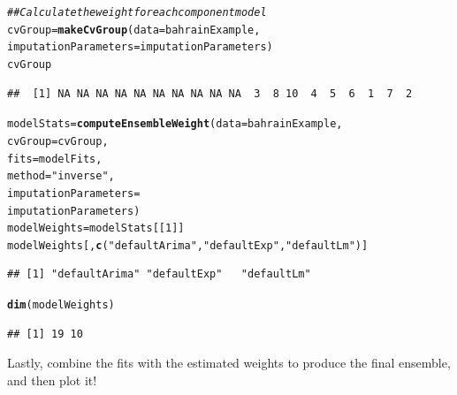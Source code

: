 \documentclass[nojss]{jss}\usepackage[]{graphicx}\usepackage[]{color}
\makeatletter
\newcommand{\hlnum}[1]{\textcolor[rgb]{0.686,0.059,0.569}{#1}}%
\newcommand{\hlstr}[1]{\textcolor[rgb]{0.192,0.494,0.8}{#1}}%
\newcommand{\hlcom}[1]{\textcolor[rgb]{0.678,0.584,0.686}{\textit{#1}}}%
\newcommand{\hlstd}[1]{\textcolor[rgb]{0.345,0.345,0.345}{#1}}%
\newcommand{\hlkwb}[1]{\textcolor[rgb]{0.69,0.353,0.396}{#1}}%
\newcommand{\hlkwc}[1]{\textcolor[rgb]{0.333,0.667,0.333}{#1}}%
\newcommand{\hlkwd}[1]{\textcolor[rgb]{0.737,0.353,0.396}{\textbf{#1}}}%
\newenvironment{kframe}{%
 \def\at@end@of@kframe{}%
 \ifinner\ifhmode%
  \def\at@end@of@kframe{\end{minipage}}%
  \begin{minipage}{\columnwidth}%
 \fi\fi%
 \def\FrameCommand##1{\hskip\@totalleftmargin \hskip-\fboxsep
 \colorbox{shadecolor}{##1}\hskip-\fboxsep
     \hskip-\linewidth \hskip-\@totalleftmargin \hskip\columnwidth}%
 \MakeFramed {\advance\hsize-\width
   \@totalleftmargin\z@ \linewidth\hsize
   \@setminipage}}%
 {\par\unskip\endMakeFramed%
 \at@end@of@kframe}
\newenvironment{knitrout}{}{} %
\makeatother
\begin{document}
\begin{knitrout}
\color{fgcolor}\begin{kframe}
\begin{alltt}
\hlcom{## Calculate the weight for each component model}
\hlstd{cvGroup} \hlkwb{=} \hlkwd{makeCvGroup}\hlstd{(}\hlkwc{data} \hlstd{= bahrainExample,}
                      \hlkwc{imputationParameters} \hlstd{= imputationParameters)}
\hlstd{cvGroup}
\end{alltt}
\begin{verbatim}
##  [1] NA NA NA NA NA NA NA NA NA NA  3  8 10  4  5  6  1  7  2
\end{verbatim}
\begin{alltt}
\hlstd{modelStats} \hlkwb{=} \hlkwd{computeEnsembleWeight}\hlstd{(}\hlkwc{data} \hlstd{= bahrainExample,}
                                   \hlkwc{cvGroup} \hlstd{= cvGroup,}
                                   \hlkwc{fits} \hlstd{= modelFits,}
                                   \hlkwc{method} \hlstd{=} \hlstr{"inverse"}\hlstd{,}
                                   \hlkwc{imputationParameters} \hlstd{=}
                                       \hlstd{imputationParameters)}
\hlstd{modelWeights} \hlkwb{=} \hlstd{modelStats[[}\hlnum{1}\hlstd{]]}
\hlstd{modelWeights[,} \hlkwd{c}\hlstd{(}\hlstr{"defaultArima"}\hlstd{,} \hlstr{"defaultExp"}\hlstd{,} \hlstr{"defaultLm"}\hlstd{)]}
\end{alltt}
\begin{verbatim}
## [1] "defaultArima" "defaultExp"   "defaultLm"
\end{verbatim}
\begin{alltt}
\hlkwd{dim}\hlstd{(modelWeights)}
\end{alltt}
\begin{verbatim}
## [1] 19 10
\end{verbatim}
\end{kframe}
\end{knitrout}

Lastly, combine the fits with the estimated weights to produce the final
ensemble, and then plot it!
\end{document}

